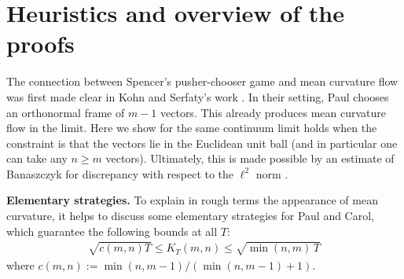 \documentclass[reqno]{amsart}
\numberwithin{equation}{section}
\begin{document}
\section{Heuristics and overview of the proofs} \label{s:heuristics and overview of the proof}

The connection between Spencer's pusher-chooser game and mean curvature flow was first made clear in Kohn and Serfaty's work \cite{KohnSerfaty2006}. In their setting, Paul chooses an orthonormal frame of $m-1$ vectors. This already produces mean curvature flow in the limit. Here we show for the same continuum limit holds when the constraint is that the vectors lie in the Euclidean unit ball (and in particular one can take any $n\geq m$ vectors). Ultimately, this is made possible by an estimate of Banaszczyk for discrepancy with respect to the $\ell^2$ norm \cite{Banaszczyk1990}.

\textbf{Elementary strategies.}  \label{sec:elementary_strategies} To explain in rough terms the appearance of mean curvature, it helps to discuss some elementary strategies for Paul and Carol, which guarantee the following bounds at all $T$:
\begin{align}\label{e:intro value function bound}
 \sqrt{ c(m,n) T}  \leq K_{T}(m,n) \leq  \sqrt {\min(n,m)\, T}
\end{align}
where $c(m,n) := \min(n,m-1)/(\min(n,m-1)+1)$. 
\end{document}
